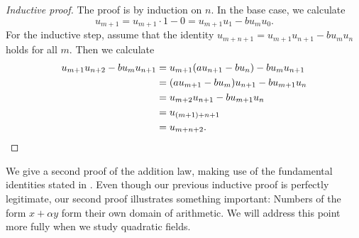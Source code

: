 \begin{proof}[Inductive proof]
  The proof is by induction on $n$. In the base case, we calculate
  \begin{equation*}
    u_{m+1}= u_{m+1}\cdot 1 - 0 = u_{m+1} u_{1}-b u_{m}u_0.
  \end{equation*}
  For the inductive step, assume that the identity $u_{m+n+1}=u_{m+1} u_{n+1}-b u_{m}u_n$ holds for all $m$. Then we calculate
  \begin{align*}
    u_{m+1} u_{n+2}-b u_{m}u_{n+1} & = u_{m+1}(au_{n+1}-bu_n)- bu_mu_{n+1} \\
                                   & = (au_{m+1}-bu_m)u_{n+1}-bu_{m+1}u_n \\
                                   & = u_{m+2}u_{n+1}-bu_{m+1}u_n \\
                                   & = u_{(m+1)+n+1} \\
                                   & = u_{m+n+2}.\qedhere
  \end{align*}
\end{proof}

We give a second proof of the addition law, making use of the fundamental identities stated in . Even though our previous inductive proof is perfectly legitimate, our second proof illustrates something important: Numbers of the form $x+\alpha y$ form their own domain of arithmetic. We will address this point more fully when we study quadratic fields.

